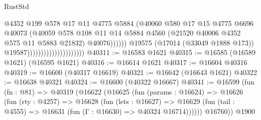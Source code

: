 \begin{lexlean}{RustStd}
\begin{coremodule}
                                                      @4352
                                                      @199
                                                      @578
                                                      @17
                                                      @11
                                                      @4775
                                                      @5884
                                                      (@40060
                                                        @580
                                                        @17
                                                        @15
                                                        @4775
                                                        @6696
                                                        @40073
                                                        (@40059
                                                          @578
                                                          @108
                                                          @11
                                                          @14
                                                          @5884
                                                          @4560
                                                          (@21520
                                                            @40006
                                                            @4352
                                                            @575
                                                            @11
                                                            @5883
                                                            @21832)
                                                          @40076))))))
                                              @19575
                                              (@17014 (@33049 @1888 @173))
                                              @19587)))))))))))))))))))))
@40311 := @16583 @1621
@40315 := @16585 (@16589 @1621) (@16595 @1621)
@40316 := @16614 @1621
@40317 := @16604 @40316
@40319 := @16600 (@40317 @16619)
@40321 := @16642 (@16643 @1621)
@40322 := @16638 @40321
@40324 := @16600 (@40322 @16667)
@40341 := @16599
    (fun (fn : @81) =>
    @40319
      (@16622
        (@16625
          (fun (params : @16624) =>
          @16626
            (fun (rty : @4257) =>
            @16628
              (fun (lets : @16627) =>
              @16629 (fun (tail : @4555) => @16631 (fun (Γ : @16630) => @40324 @16714))))))
        @16760))
    @1900

\end{coremodule}
\end{lexlean}
